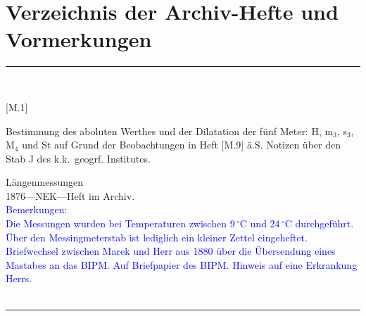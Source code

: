 

\chapter{Verzeichnis der Archiv-Hefte und Vormerkungen}
\parbox{\textwidth}{%
\rule{\textwidth}{1pt}\vspace*{-3mm}\\
\begin{minipage}[t]{0.2\textwidth}\vspace{0pt}
\Huge\rule[-4mm]{0cm}{1cm}[M.1]
\end{minipage}
\hfill
\begin{minipage}[t]{0.8\textwidth}\vspace{0pt}
\large Bestimmung des aboluten Werthes und der Dilatation der fünf Meter: H, m$_\mathrm{3}$, s$_\mathrm{3}$, M$_\mathrm{4}$ und St auf Grund der Beobachtungen in Heft [M.9] ä.S. Notizen über den Stab {\glqq}J{\grqq} des k.k.\ geogrf. Institutes.\rule[-2mm]{0mm}{2mm}
\end{minipage}
{\footnotesize\flushright
Längenmessungen\\
}
1876\quad---\quad NEK\quad---\quad Heft im Archiv.\\
\textcolor{blue}{Bemerkungen:\\{}
Die Messungen wurden bei Temperaturen zwischen 9\,{$^\circ$}C und 24\,{$^\circ$}C durchgeführt.\\{}
Über den Messingmeterstab ist lediglich ein kleiner Zettel eingeheftet.\\{}
Briefwechsel zwischen Marek und Herr aus 1880 über die Übersendung eines Mastabes an das BIPM. Auf Briefpapier des BIPM. Hinweis auf eine Erkrankung Herrs.\\{}
}
\\[-15pt]
\rule{\textwidth}{1pt}
}
\\
\vspace*{-2.5pt}\\
